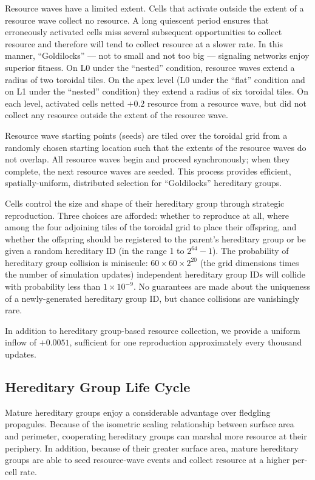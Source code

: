 Resource waves have a limited extent.
Cells that activate outside the extent of a resource wave collect no resource.
A long quiescent period ensures that erroneously activated cells miss several subsequent opportunities to collect resource and therefore will tend to collect resource at a slower rate.
In this manner, ``Goldilocks'' --- not to small and not too big --- signaling networks enjoy superior fitness.
On L0 under the ``nested'' condition, resource waves extend a radius of two toroidal tiles.
On the apex level (L0 under the ``flat'' condition and on L1 under the ``nested'' condition) they extend a radius of six toroidal tiles.
On each level, activated cells netted $+0.2$ resource from a resource wave, but did not collect any resource outside the extent of the resource wave.

Resource wave starting points (seeds) are tiled over the toroidal grid from a randomly chosen starting location such that the extents of the resource waves do not overlap.
All resource waves begin and proceed synchronously;
when they complete, the next resource waves are seeded.
This process provides efficient, spatially-uniform, distributed selection for ``Goldilocks'' hereditary groups.

Cells control the size and shape of their hereditary group through strategic reproduction.
Three choices are afforded: whether to reproduce at all, where among the four adjoining tiles of the toroidal grid to place their offspring, and whether the offspring should be registered to the parent's hereditary group or be given a random hereditary ID (in the range 1 to $2^{64} - 1$).
The probability of hereditary group collision is miniscule: $60 \times 60 \times 2^{20}$ (the grid dimensions times the number of simulation updates) independent hereditary group IDs will collide with probability less than $1 \times 10^{-9}$.
No guarantees are made about the uniqueness of a newly-generated hereditary group ID, but chance collisions are vanishingly rare.

In addition to hereditary group-based resource collection, we provide a uniform inflow of $+0.0051$, sufficient for one reproduction approximately every thousand updates.

\subsection{Hereditary Group Life Cycle} \label{sup:hereditary_group_life_cycle}

Mature hereditary groups enjoy a considerable advantage over fledgling propagules.
Because of the isometric scaling relationship between surface area and perimeter, cooperating hereditary groups can marshal more resource at their periphery.
In addition, because of their greater surface area, mature hereditary groups are able to seed resource-wave events and collect resource at a higher per-cell rate.

